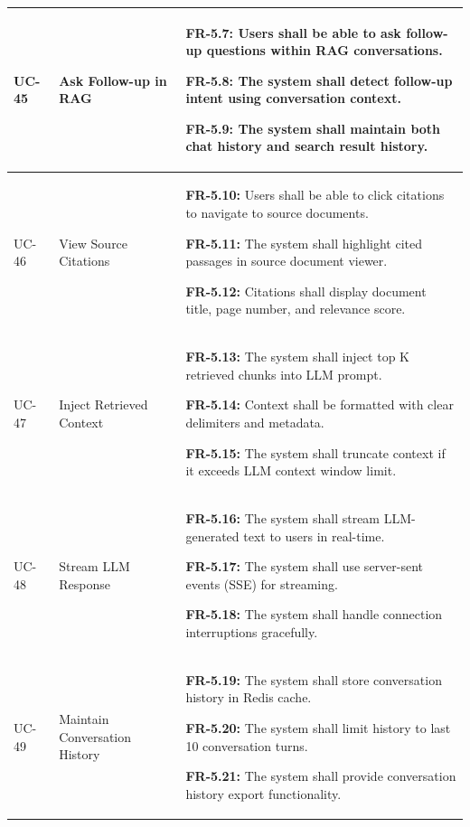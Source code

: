 \begin{longtable}{|>{\raggedright\arraybackslash}p{}|>{\raggedright\arraybackslash}p{}|>{\raggedright\arraybackslash}p{}|}
UC-45 & Ask Follow-up in RAG &
\begin{frequirements}
\item \textbf{FR-5.7:} Users shall be able to ask follow-up questions within RAG conversations.
\item \textbf{FR-5.8:} The system shall detect follow-up intent using conversation context.
\item \textbf{FR-5.9:} The system shall maintain both chat history and search result history.
\end{frequirements} \\
\hline

UC-46 & View Source Citations &
\begin{frequirements}
\item \textbf{FR-5.10:} Users shall be able to click citations to navigate to source documents.
\item \textbf{FR-5.11:} The system shall highlight cited passages in source document viewer.
\item \textbf{FR-5.12:} Citations shall display document title, page number, and relevance score.
\end{frequirements} \\
\hline

UC-47 & Inject Retrieved Context &
\begin{frequirements}
\item \textbf{FR-5.13:} The system shall inject top K retrieved chunks into LLM prompt.
\item \textbf{FR-5.14:} Context shall be formatted with clear delimiters and metadata.
\item \textbf{FR-5.15:} The system shall truncate context if it exceeds LLM context window limit.
\end{frequirements} \\
\hline

UC-48 & Stream LLM Response &
\begin{frequirements}
\item \textbf{FR-5.16:} The system shall stream LLM-generated text to users in real-time.
\item \textbf{FR-5.17:} The system shall use server-sent events (SSE) for streaming.
\item \textbf{FR-5.18:} The system shall handle connection interruptions gracefully.
\end{frequirements} \\
\hline

UC-49 & Maintain Conversation History &
\begin{frequirements}
\item \textbf{FR-5.19:} The system shall store conversation history in Redis cache.
\item \textbf{FR-5.20:} The system shall limit history to last 10 conversation turns.
\item \textbf{FR-5.21:} The system shall provide conversation history export functionality.
\end{frequirements} \\
\hline


\end{longtable}
